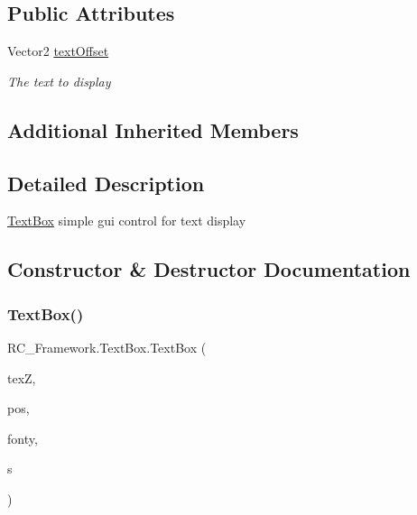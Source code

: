 \subsection*{Public Attributes}
\begin{DoxyCompactItemize}
\item 
Vector2 \mbox{\hyperlink{class_r_c___framework_1_1_text_box_a9af3d3d79601df6df4fd8b83a1cda7e2}{text\+Offset}}
\begin{DoxyCompactList}\small\item\em The text to display \end{DoxyCompactList}\end{DoxyCompactItemize}
\subsection*{Additional Inherited Members}


\subsection{Detailed Description}
\mbox{\hyperlink{class_r_c___framework_1_1_text_box}{Text\+Box}} simple gui control for text display 



\subsection{Constructor \& Destructor Documentation}
\mbox{\label{class_r_c___framework_1_1_text_box_a59fb82c062e9d8a5136538040886c888}} 
\subsubsection{\texorpdfstring{Text\+Box()}{TextBox()}\hspace{0.1cm}{\footnotesize\ttfamily [1/2]}}
{\footnotesize\ttfamily R\+C\+\_\+\+Framework.\+Text\+Box.\+Text\+Box (\begin{DoxyParamCaption}\item[{Texture2D}]{texZ,  }\item[{Vector2}]{pos,  }\item[{Sprite\+Font}]{fonty,  }\item[{string}]{s }\end{DoxyParamCaption})}



